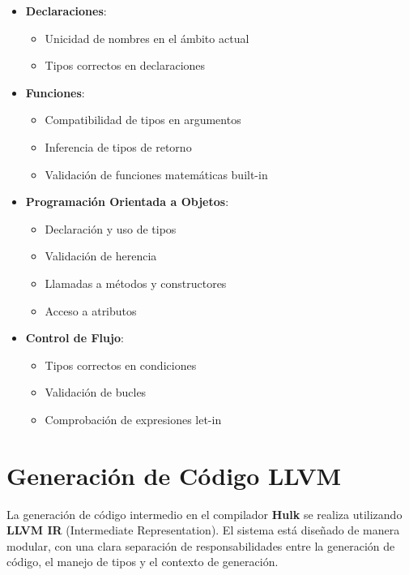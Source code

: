 \documentclass[11pt, a4paper, twoside]{article} %
\begin{document}
\begin{itemize}
    \item \textbf{Declaraciones}:
    \begin{itemize}
        \item Unicidad de nombres en el ámbito actual
        \item Tipos correctos en declaraciones
    \end{itemize}

    \item \textbf{Funciones}:
    \begin{itemize}
        \item Compatibilidad de tipos en argumentos
        \item Inferencia de tipos de retorno
        \item Validación de funciones matemáticas built-in
    \end{itemize}

    \item \textbf{Programaci\'on Orientada a Objetos}:
    \begin{itemize}
        \item Declaración y uso de tipos
        \item Validación de herencia
        \item Llamadas a métodos y constructores
        \item Acceso a atributos
    \end{itemize}

    \item \textbf{Control de Flujo}:
    \begin{itemize}
        \item Tipos correctos en condiciones
        \item Validación de bucles
        \item Comprobación de expresiones let-in
    \end{itemize}
\end{itemize}


\section{Generación de Código LLVM}

La generación de código intermedio en el compilador \textbf{Hulk} se realiza utilizando \textbf{LLVM IR} (Intermediate Representation). El sistema está diseñado de manera modular, con una clara separación de responsabilidades entre la generación de código, el manejo de tipos y el contexto de generación.
\end{document}
